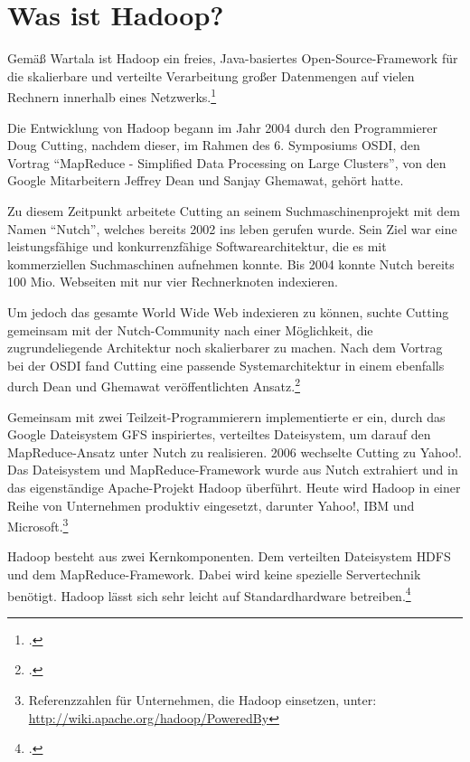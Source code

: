 \section{Was ist Hadoop?}\label{sec:WasIstHadoop}
Gemäß Wartala ist Hadoop \flqq ein freies, Java-basiertes Open-Source-Framework für die skalierbare und verteilte Verarbeitung großer Datenmengen auf vielen Rechnern innerhalb eines Netzwerks.\frqq\footcite[S. 21]{Wartala.2012}

Die Entwicklung von Hadoop begann im Jahr 2004 durch den Programmierer Doug Cutting, nachdem dieser, im Rahmen des 6. Symposiums \ac{OSDI}, den Vortrag "`MapReduce - Simplified Data Processing on Large Clusters"', von den Google Mitarbeitern Jeffrey Dean und Sanjay Ghemawat, gehört hatte.

Zu diesem Zeitpunkt arbeitete Cutting an seinem Suchmaschinenprojekt mit dem Namen "`Nutch"', welches bereits 2002 ins leben gerufen wurde. Sein Ziel war eine leistungsfähige und konkurrenzfähige Softwarearchitektur, die es mit kommerziellen Suchmaschinen aufnehmen konnte. Bis 2004 konnte Nutch bereits 100 Mio. Webseiten mit nur vier Rechnerknoten indexieren.

Um jedoch das gesamte World Wide Web indexieren zu können, suchte Cutting gemeinsam mit der Nutch-Community nach einer Möglichkeit, die zugrundeliegende Architektur noch skalierbarer zu machen. Nach dem Vortrag bei der \ac{OSDI} fand Cutting eine passende Systemarchitektur in einem ebenfalls durch Dean und Ghemawat veröffentlichten Ansatz.\footcite[Näheres siehe][]{Dean.2004}

Gemeinsam mit zwei Teilzeit-Programmierern implementierte er ein, durch das Google Dateisystem \ac{GFS} inspiriertes, verteiltes Dateisystem, um darauf den MapReduce-Ansatz unter Nutch zu realisieren. 2006 wechselte Cutting zu Yahoo!. Das Dateisystem und MapReduce-Framework wurde aus Nutch extrahiert und in das eigenständige Apache-Projekt Hadoop überführt. Heute wird Hadoop in einer Reihe von Unternehmen produktiv eingesetzt, darunter Yahoo!, IBM und Microsoft.\footnote{Referenzzahlen für Unternehmen, die Hadoop einsetzen, unter:\\ \url{http://wiki.apache.org/hadoop/PoweredBy}}

Hadoop besteht aus zwei Kernkomponenten. Dem verteilten Dateisystem \ac{HDFS} und dem MapReduce-Framework. Dabei wird keine spezielle Servertechnik benötigt. Hadoop lässt sich sehr leicht auf Standardhardware betreiben.\footcite[Vgl.][S. 19-22]{Wartala.2012}

